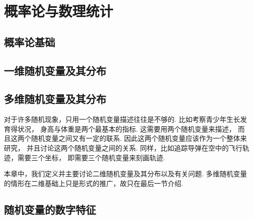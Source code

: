 \part{概率论与数理统计}
\begingroup
\def\x{\chi^2}%
\def\dotsim{\overset{.}{\sim}}%

\chapter{概率论基础}






\chapter{一维随机变量及其分布}





\chapter{多维随机变量及其分布}
对于许多随机现象，只用一个随机变量描述往往是不够的.
比如考察青少年生长发育得状况，
身高与体重是两个最基本的指标.
这需要用两个随机变量来描述，
而且这两个随机变量之间又有一定的联系.
因此这两个随机变量应该作为一个整体来研究，
并且讨论这两个随机变量之间的关系.
同样，比如追踪导弹在空中的飞行轨迹，需要三个坐标，
即需要三个随机变量来刻画轨迹.

本章中，我们定义并主要讨论二维随机变量及其分布以及有关问题.
多维随机变量的情形在二维基础上只是形式的推广，故只在最后一节介绍.









\chapter{随机变量的数字特征}









